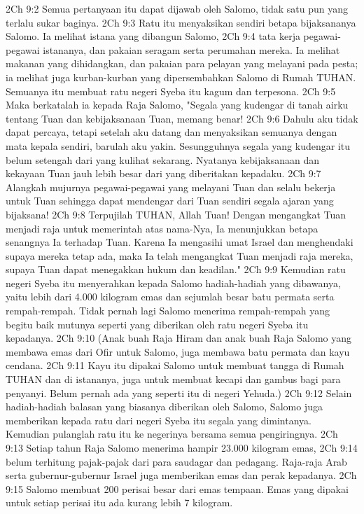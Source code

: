 2Ch 9:2  Semua pertanyaan itu dapat dijawab oleh Salomo, tidak satu pun yang terlalu sukar baginya.
2Ch 9:3  Ratu itu menyaksikan sendiri betapa bijaksananya Salomo. Ia melihat istana yang dibangun Salomo,
2Ch 9:4  tata kerja pegawai-pegawai istananya, dan pakaian seragam serta perumahan mereka. Ia melihat makanan yang dihidangkan, dan pakaian para pelayan yang melayani pada pesta; ia melihat juga kurban-kurban yang dipersembahkan Salomo di Rumah TUHAN. Semuanya itu membuat ratu negeri Syeba itu kagum dan terpesona.
2Ch 9:5  Maka berkatalah ia kepada Raja Salomo, "Segala yang kudengar di tanah airku tentang Tuan dan kebijaksanaan Tuan, memang benar!
2Ch 9:6  Dahulu aku tidak dapat percaya, tetapi setelah aku datang dan menyaksikan semuanya dengan mata kepala sendiri, barulah aku yakin. Sesungguhnya segala yang kudengar itu belum setengah dari yang kulihat sekarang. Nyatanya kebijaksanaan dan kekayaan Tuan jauh lebih besar dari yang diberitakan kepadaku.
2Ch 9:7  Alangkah mujurnya pegawai-pegawai yang melayani Tuan dan selalu bekerja untuk Tuan sehingga dapat mendengar dari Tuan sendiri segala ajaran yang bijaksana!
2Ch 9:8  Terpujilah TUHAN, Allah Tuan! Dengan mengangkat Tuan menjadi raja untuk memerintah atas nama-Nya, Ia menunjukkan betapa senangnya Ia terhadap Tuan. Karena Ia mengasihi umat Israel dan menghendaki supaya mereka tetap ada, maka Ia telah mengangkat Tuan menjadi raja mereka, supaya Tuan dapat menegakkan hukum dan keadilan."
2Ch 9:9  Kemudian ratu negeri Syeba itu menyerahkan kepada Salomo hadiah-hadiah yang dibawanya, yaitu lebih dari 4.000 kilogram emas dan sejumlah besar batu permata serta rempah-rempah. Tidak pernah lagi Salomo menerima rempah-rempah yang begitu baik mutunya seperti yang diberikan oleh ratu negeri Syeba itu kepadanya.
2Ch 9:10  (Anak buah Raja Hiram dan anak buah Raja Salomo yang membawa emas dari Ofir untuk Salomo, juga membawa batu permata dan kayu cendana.
2Ch 9:11  Kayu itu dipakai Salomo untuk membuat tangga di Rumah TUHAN dan di istananya, juga untuk membuat kecapi dan gambus bagi para penyanyi. Belum pernah ada yang seperti itu di negeri Yehuda.)
2Ch 9:12  Selain hadiah-hadiah balasan yang biasanya diberikan oleh Salomo, Salomo juga memberikan kepada ratu dari negeri Syeba itu segala yang dimintanya. Kemudian pulanglah ratu itu ke negerinya bersama semua pengiringnya.
2Ch 9:13  Setiap tahun Raja Salomo menerima hampir 23.000 kilogram emas,
2Ch 9:14  belum terhitung pajak-pajak dari para saudagar dan pedagang. Raja-raja Arab serta gubernur-gubernur Israel juga memberikan emas dan perak kepadanya.
2Ch 9:15  Salomo membuat 200 perisai besar dari emas tempaan. Emas yang dipakai untuk setiap perisai itu ada kurang lebih 7 kilogram.
